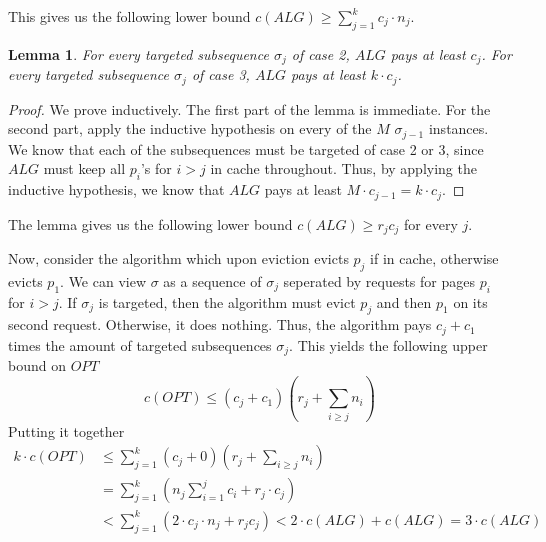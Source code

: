 \documentclass[12pt]{article}
\newtheorem{lemma}{Lemma}      %
\begin{document}
This gives us the following lower bound $c(ALG)\geq \sum_{j=1}^k c_j \cdot n_j$. 
\begin{lemma}
For every targeted subsequence $\sigma_j$ of case 2, $ALG$ pays at least $c_j$. For every targeted subsequence $\sigma_j$ of case 3, $ALG$ pays at least $k \cdot c_j $.  
\end{lemma}
\begin{proof}
  We prove inductively. The first part of the lemma is immediate. For the second part, apply the inductive hypothesis on every of the $M$ $\sigma_{j-1}$ instances.
  We know that each of the subsequences must be targeted of case 2 or 3, since $ALG$ must keep all $p_i$'s for $i>j$ in cache throughout.
  Thus, by applying the inductive hypothesis, we know that $ALG$ pays at least $M \cdot c_{j-1}=k\cdot c_j$.
\end{proof}
The lemma gives us the following lower bound $c(ALG) \geq r_jc_j$ for every $j$. 

Now, consider the algorithm which upon eviction evicts $p_j$ if in cache, otherwise evicts $p_1$. 
We can view $\sigma$ as a sequence of $\sigma_j$ seperated by requests for pages $p_i$ for $i>j$. 
If $\sigma_j$ is targeted, then the algorithm must evict $p_j$ and then $p_1$ on its second request. Otherwise, it does nothing.
Thus, the algorithm pays $c_j+c_1$ times the amount of targeted subsequences $\sigma_j$. This yields the following upper bound on $OPT$
\[
  c(OPT)\leq (c_j+c_1) \left( r_j + \sum_{i\geq j} n_i \right) 
\] 
Putting it together
\begin{align*}
  k \cdot c(OPT) &\leq \sum_{j=1}^k (c_j + 0) \left( r_j + \sum_{i\geq j} n_i \right) \\
                 &= \sum_{j=1}^k \left(n_j \sum_{i=1}^j c_i + r_j\cdot c_j\right) \\
                 &< \sum_{j=1}^k \left( 2\cdot c_j\cdot n_j + r_jc_j\right) < 2\cdot c(ALG) + c(ALG) = 3\cdot c(ALG)
\end{align*}
\end{document}
